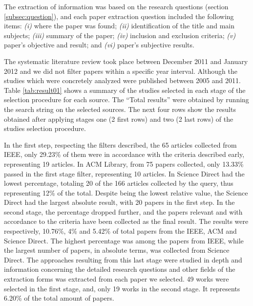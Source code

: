  
The extraction of information was based on the research questions (section
\ref{subsec:question}), and each paper extraction question included the following items: \textit{(i)}
where the paper was found; \textit{(ii)} identification of the title and main
subjects; \textit{(iii)} summary of the paper; \textit{(iv)} inclusion and exclusion
criteria; \textit{(v)} paper's objective and result; and \textit{(vi)}
paper's subjective results.

The systematic literature review took place between December 2011 and January
2012 and we did not filter papers within a specific year interval. Although the
studies which were concretely analyzed were published between 2005 and 2011.
Table \ref{tab:result01} shows a summary of the studies selected in each stage
of the selection procedure for each source. The ``Total results'' were obtained
by running the search string on the selected sources. The next four rows show
the results obtained after applying stages one (2 first rows) and two (2 last
rows) of the studies selection procedure. 

In the first step, respecting the filters described, the 65 articles collected
from IEEE, only 29.23\% of them were in accordance with the criteria 
described early, representing 19 articles. In ACM Library, from 75 papers
collected, only 13.33\% passed in the first stage filter, representing 10 articles. In Science Direct
had the lowest percentage, totaling 20 of the 166 articles collected by the
query, thus representing 12\% of the total. Despite being the lowest relative
value, the Science Direct had the largest absolute result, with 20 papers
in the first step. In the second stage, the percentage dropped further, and the 
papers relevant and with accordance to the criteria have been collected as the final
result. The results were respectively, 10.76\%, 4\% and 5.42\% of total papers
from the IEEE, ACM and Science Direct. The highest percentage was among the
 papers from  IEEE, while the largest number of papers, in absolute terms,
 was collected from Science Direct. The approaches resulting from this last
 stage were studied in depth and information concerning the detailed research
 questions and other fields of the extraction forms was extracted from each
 paper we selected. 49 works were selected in the first stage, and, only 19
 works in the second stage. It represents  6.20\% of the total amount of papers.

% 
%           